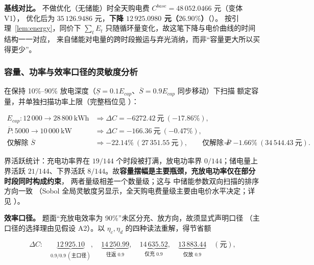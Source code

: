 \textbf{基线对比。} 不做优化（无储能）时全天购电费 \(C^{base}=48\,052.0466\) 元（变体 V1），
优化后为 \(35\,126.9486\) 元，\textbf{下降 \(12\,925.0980\) 元（\(26.90\%\)）}（）。
按引理~\ref{lem:energy}，同价下 \(\sum_tE_t\) 只随循环量变化，故这笔下降与电价曲线的时间结构一一对应，
来自储能对电量的跨时段搬运与弃光消纳，而非“容量更大所以买得更少”。

\subsubsection{容量、功率与效率口径的灵敏度分析}\label{sec:q1-scan}

在保持 10\%--90\% 放电深度（\(\underline S=0.1E_{cap}\)、\(\overline S=0.9E_{cap}\) 同步移动）下扫描
额定容量，并单独扫描功率上限（完整档位见 ）：

\begin{equation}
  \begin{aligned}
    E_{cap}:12\,000\to28\,800\ \text{kWh} &\Rightarrow \Delta C=-6272.42\ \text{元}\ (-17.86\%),\\
    \overline P:5000\to10\,000\ \text{kW} &\Rightarrow \Delta C=-166.36\ \text{元}\ (-0.47\%),\\
    \text{仅解除 }\overline S &\Rightarrow -22.14\%\ (27\,351.55\ \text{元}),\qquad
    \text{仅解除 }\overline P &\Rightarrow -1.66\%\ (34\,544.43\ \text{元}).
  \end{aligned}
  \label{eq:q1-scan}
\end{equation}

界活跃统计：充电功率界在 \(19/144\) 个时段被打满，放电功率界 \(0/144\)；储电量上界活跃
\(21/144\)、下界活跃 \(8/144\)。故\textbf{容量摆幅是主要瓶颈，充放电功率仅在部分时段同时构成约束}，
两者量级相差一个数量级；这与  中储能参数双向扫描的排序方向一致
（Sobol 全局灵敏度另显示，全天购电费量级主要由电价水平决定；详见
）。

\textbf{效率口径。} 题面“充放电效率为 90\%”未区分充、放方向，故须显式声明口径
（主口径的选择理由见假设 A2）。以 \(\eta_c,\eta_d\) 的四种读法重解，得节省额

\begin{equation}
  \Delta C:\quad
  \underbrace{12\,925.10}_{0.9/0.9\ (\text{主口径})},\quad
  \underbrace{14\,250.99}_{\text{往返 }0.9},\quad
  \underbrace{14\,635.52}_{\text{仅充 }0.9},\quad
  \underbrace{13\,883.44}_{\text{仅放 }0.9}\quad(\text{元}),
  \label{eq:q1-eff}
\end{equation}

